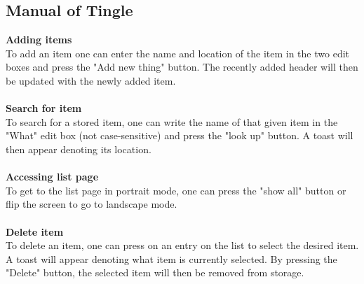 \documentclass{article}
\begin{document}
\subsection{Manual of Tingle}\label{manual}
\textbf{Adding items}\\To add an item one can enter the name and location of the item in the two edit boxes and press the "Add new thing" button. The recently added header will then be updated with the newly added item.\\\\\textbf{Search for item}\\To search for a stored item, one can write the name of that given item in the "What" edit box (not case-sensitive) and press the "look up" button. A toast will then appear denoting its location.\\\\\textbf{Accessing list page}\\To get to the list page in portrait mode, one can press the "show all" button or flip the screen to go to landscape mode.\\\\\textbf{Delete item}\\To delete an item, one can press on an entry on the list to select the desired item. A toast will appear denoting what item is currently selected. By pressing the "Delete" button, the selected item will then be removed from storage.

\pagebreak
\end{document}
